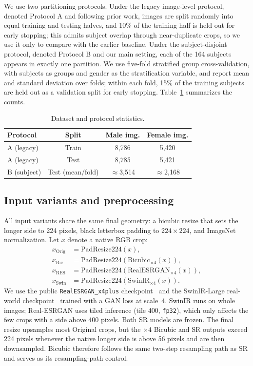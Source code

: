\documentclass[conference]{IEEEtran}
\begin{document}
We use two partitioning protocols. Under the legacy image-level protocol, denoted Protocol A and following prior work, images are split randomly into equal training and testing halves, and 10\% of the training half is held out for early stopping; this admits subject overlap through near-duplicate crops, so we use it only to compare with the earlier baseline. Under the subject-disjoint protocol, denoted Protocol B and our main setting, each of the 164 subjects appears in exactly one partition. We use five-fold stratified group cross-validation, with subjects as groups and gender as the stratification variable, and report mean and standard deviation over folds; within each fold, 15\% of the training subjects are held out as a validation split for early stopping. Table~\ref{tab:dataset} summarizes the counts.

\begin{table}[t]
\centering
\caption{Dataset and protocol statistics.}
\label{tab:dataset}
\small
\begin{tabular}{@{}lccc@{}}
\toprule
Protocol & Split & Male img. & Female img. \\
\midrule
A (legacy)   & Train & 8{,}786 & 5{,}420 \\
A (legacy)   & Test  & 8{,}785 & 5{,}421 \\
B (subject)  & Test (mean/fold) & $\approx$3{,}514 & $\approx$2{,}168 \\
\bottomrule
\end{tabular}
\end{table}

\subsection{Input variants and preprocessing}
All input variants share the same final geometry: a bicubic resize that sets the longer side to 224 pixels, black letterbox padding to $224\times224$, and ImageNet normalization. Let $x$ denote a native RGB crop:
\begin{align}
x_{\text{Orig}} &= \text{PadResize224}(x), \\
x_{\text{Bic}}  &= \text{PadResize224}(\text{Bicubic}_{\times4}(x)), \\
x_{\text{RES}}  &= \text{PadResize224}(\text{RealESRGAN}_{\times4}(x)), \\
x_{\text{Swin}} &= \text{PadResize224}(\text{SwinIR}_{\times4}(x)).
\end{align}
We use the public \texttt{RealESRGAN\_x4plus} checkpoint~\cite{realesrgan} and the SwinIR-Large real-world checkpoint~\cite{swinir} trained with a GAN loss at scale~4. SwinIR runs on whole images; Real-ESRGAN uses tiled inference (tile 400, \texttt{fp32}), which only affects the few crops with a side above 400 pixels. Both SR models are frozen. The final resize upsamples most Original crops, but the $\times4$ Bicubic and SR outputs exceed 224 pixels whenever the native longer side is above 56 pixels and are then downsampled. Bicubic therefore follows the same two-step resampling path as SR and serves as its resampling-path control.
\end{document}
